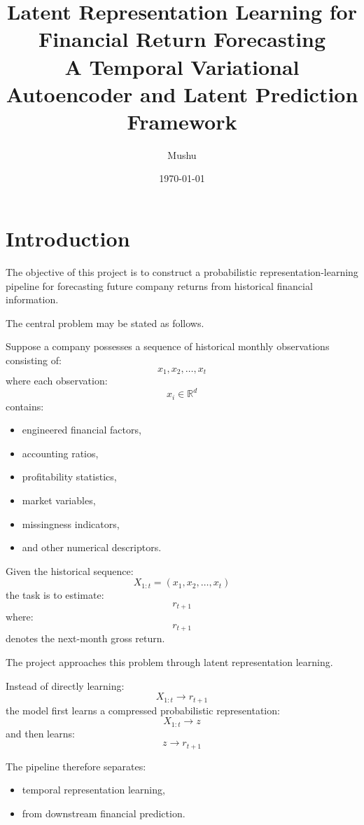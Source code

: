 \documentclass[11pt]{article}
\title{
Latent Representation Learning for Financial Return Forecasting \\
\vspace{0.2cm}
\large A Temporal Variational Autoencoder and Latent Prediction Framework
}
\author{
Mushu
}
\date{\today}
\begin{document}
\maketitle

\tableofcontents

\newpage

\section{Introduction}

The objective of this project is to construct a probabilistic representation-learning pipeline for forecasting future company returns from historical financial information.

The central problem may be stated as follows.

Suppose a company possesses a sequence of historical monthly observations consisting of:
\[
x_1, x_2, \dots, x_t
\]
where each observation:
\[
x_i \in \mathbb{R}^d
\]
contains:
\begin{itemize}
    \item engineered financial factors,
    \item accounting ratios,
    \item profitability statistics,
    \item market variables,
    \item missingness indicators,
    \item and other numerical descriptors.
\end{itemize}

Given the historical sequence:
\[
X_{1:t}
=
(x_1,x_2,\dots,x_t)
\]
the task is to estimate:
\[
r_{t+1}
\]
where:
\[
r_{t+1}
\]
denotes the next-month gross return.

The project approaches this problem through latent representation learning.

Instead of directly learning:
\[
X_{1:t} \rightarrow r_{t+1}
\]
the model first learns a compressed probabilistic representation:
\[
X_{1:t} \rightarrow z
\]
and then learns:
\[
z \rightarrow r_{t+1}
\]

The pipeline therefore separates:
\begin{itemize}
    \item temporal representation learning,
    \item from downstream financial prediction.
\end{itemize}
\end{document}
